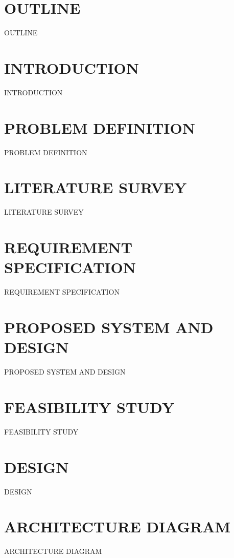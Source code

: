 \documentclass[svgnames,9pt]{beamer}
\begin{document}
\section{OUTLINE}
\begin{frame}{OUTLINE}
	\tableofcontents
\end{frame}
\section{INTRODUCTION}
\begin{frame}{INTRODUCTION}
\end{frame}
\section{PROBLEM DEFINITION}
\begin{frame}{PROBLEM DEFINITION}
\end{frame}
\section{LITERATURE SURVEY}
\begin{frame}{LITERATURE SURVEY}
\end{frame}
\section{REQUIREMENT SPECIFICATION}
\begin{frame}{REQUIREMENT SPECIFICATION}
\end{frame}
\section{PROPOSED SYSTEM AND DESIGN}
\begin{frame}{PROPOSED SYSTEM AND DESIGN}
\end{frame}
\section{FEASIBILITY STUDY}
\begin{frame}{FEASIBILITY STUDY}
\end{frame}
\section{DESIGN}
\begin{frame}{DESIGN}
\end{frame}
\section{ARCHITECTURE DIAGRAM}
\begin{frame}{ARCHITECTURE DIAGRAM}	
\end{frame}
\end{document}
